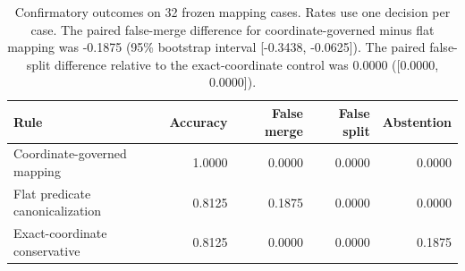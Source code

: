 \begin{table}[t]
\centering
\small
\begin{tabular}{lrrrr}
\toprule
\textbf{Rule} & \textbf{Accuracy} & \textbf{False merge} & \textbf{False split} & \textbf{Abstention} \\
\midrule
Coordinate-governed mapping & 1.0000 & 0.0000 & 0.0000 & 0.0000 \\
Flat predicate canonicalization & 0.8125 & 0.1875 & 0.0000 & 0.0000 \\
Exact-coordinate conservative & 0.8125 & 0.0000 & 0.0000 & 0.1875 \\
\bottomrule
\end{tabular}
\caption{Confirmatory outcomes on 32 frozen mapping cases. Rates use one decision per case. The paired false-merge difference for coordinate-governed minus flat mapping was -0.1875 (95\% bootstrap interval [-0.3438, -0.0625]). The paired false-split difference relative to the exact-coordinate control was 0.0000 ([0.0000, 0.0000]).}
\label{tab:confirmatory-primary}
\end{table}
